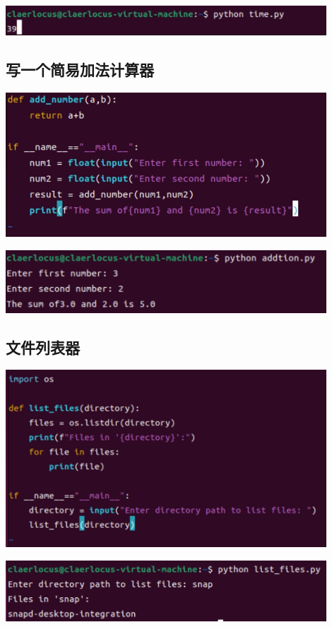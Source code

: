 \documentclass[UTF8,a4paper]{ctexart}
\begin{document}
\begin{sloppypar}
	\includegraphics[width = 12cm]{29.2}
	
	
	\subsection{写一个简易加法计算器}
	
	\includegraphics[width = 12cm]{30.1}
	
	\includegraphics[width = 12cm]{30.2}
	
	\subsection{文件列表器}
	
	\includegraphics[width = 12cm]{31.1}
	
	\includegraphics[width = 12cm]{31.2}
	

\end{sloppypar}
\end{document}
